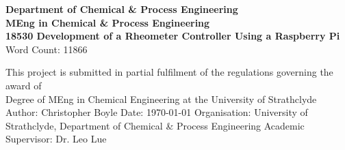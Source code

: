 \documentclass[twoside,a4]{report}
\def\atitle{Development of a Rheometer Controller Using a Raspberry Pi}
\def\thewords{10326} %
\def\thewords{11866}
\begin{document}
	\begin{titlepage}
		\centering
		\vskip3cm
		{
			\bfseries\Large
			Department of Chemical \& Process Engineering\\
			\vskip1cm
			MEng in Chemical \& Process Engineering\\
			18530
			\vskip3cm
			\LARGE\atitle
		}
		\vskip3cm
		{\small Word Count: \thewords}
		\vskip1cm
		\begin{flushleft}
			This project is submitted in partial fulfilment of the regulations governing the award of \\
			Degree of MEng in Chemical Engineering at the University of Strathclyde
			\vskip2cm
			Author: Christopher Boyle \hfill Date: \today \newline
			\vskip1cm
			Organisation: University of Strathclyde, Department of Chemical \& Process Engineering \newline
			Academic Supervisor: Dr. Leo Lue
		\end{flushleft}
	\end{titlepage}
\end{document}
